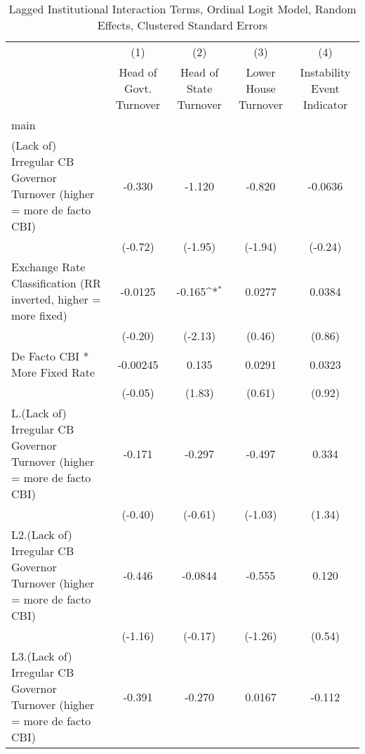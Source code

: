 {
\def\sym#1{\ifmmode^{#1}\else\(^{#1}\)\fi}
\begin{longtable}{l*{4}{c}}
\caption{Lagged Institutional Interaction Terms, Ordinal Logit Model, Random Effects, Clustered Standard Errors \label{intlagordLogLogDF}}\\
\hline\hline\endfirsthead\hline\endhead\hline\endfoot\endlastfoot
                &\multicolumn{1}{c}{(1)}&\multicolumn{1}{c}{(2)}&\multicolumn{1}{c}{(3)}&\multicolumn{1}{c}{(4)}\\
                &\multicolumn{1}{c}{Head of Govt. Turnover}&\multicolumn{1}{c}{Head of State Turnover}&\multicolumn{1}{c}{Lower House Turnover}&\multicolumn{1}{c}{Instability Event Indicator}\\
\hline
main            &                  &                  &                  &                  \\
(Lack of) Irregular CB Governor Turnover (higher = more de facto CBI)&   -0.330         &   -1.120         &   -0.820         &  -0.0636         \\
                &  (-0.72)         &  (-1.95)         &  (-1.94)         &  (-0.24)         \\
[1em]
Exchange Rate Classification (RR inverted, higher = more fixed)&  -0.0125         &   -0.165\sym{*}  &   0.0277         &   0.0384         \\
                &  (-0.20)         &  (-2.13)         &   (0.46)         &   (0.86)         \\
[1em]
De Facto CBI * More Fixed Rate& -0.00245         &    0.135         &   0.0291         &   0.0323         \\
                &  (-0.05)         &   (1.83)         &   (0.61)         &   (0.92)         \\
[1em]
L.(Lack of) Irregular CB Governor Turnover (higher = more de facto CBI)&   -0.171         &   -0.297         &   -0.497         &    0.334         \\
                &  (-0.40)         &  (-0.61)         &  (-1.03)         &   (1.34)         \\
[1em]
L2.(Lack of) Irregular CB Governor Turnover (higher = more de facto CBI)&   -0.446         &  -0.0844         &   -0.555         &    0.120         \\
                &  (-1.16)         &  (-0.17)         &  (-1.26)         &   (0.54)         \\
[1em]
L3.(Lack of) Irregular CB Governor Turnover (higher = more de facto CBI)&   -0.391         &   -0.270         &   0.0167         &   -0.112         \\

\end{longtable}}
